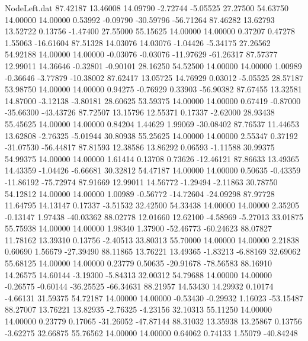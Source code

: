 \begin{filecontents}{NodeLeft.dat}
  87.42187   13.46008   14.09790    -2.72744   -5.05525   27.27500   54.63750   14.00000   14.00000    0.53992   -0.09790  -30.59796  -56.71264
  87.46282   13.62793   13.52722     0.13756   -1.47400   27.55000   55.15625   14.00000   14.00000    0.37207    0.47278    1.55063  -16.61604
  87.51328   14.03076   14.03076    -1.04426   -5.34175   27.26562   54.92188   14.00000   14.00000   -0.03076   -0.03076  -11.97629  -61.26317
  87.57377   12.99011   14.36646    -0.32801   -0.90101   28.16250   54.52500   14.00000   14.00000    1.00989   -0.36646   -3.77879  -10.38002
  87.62417   13.05725   14.76929     0.03012   -5.05525   28.57187   53.98750   14.00000   14.00000    0.94275   -0.76929    0.33903  -56.90382
  87.67455   13.32581   14.87000    -3.12138   -3.80181   28.60625   53.59375   14.00000   14.00000    0.67419   -0.87000  -35.66300  -43.43726
  87.72507   13.15796   12.55371     0.17337   -2.62000   28.93438   55.45625   14.00000   14.00000    0.84204    1.44629    1.99069  -30.08402
  87.76537   11.44653   13.62808    -2.76325   -5.01944   30.80938   55.25625   14.00000   14.00000    2.55347    0.37192  -31.07530  -56.44817
  87.81593   12.38586   13.86292     0.06593   -1.11588   30.99375   54.99375   14.00000   14.00000    1.61414    0.13708    0.73626  -12.46121
  87.86633   13.49365   14.43359    -1.04426   -6.66681   30.32812   54.47187   14.00000   14.00000    0.50635   -0.43359  -11.86192  -75.72974
  87.91669   12.99011   14.56772    -1.29494   -2.11863   30.78750   54.12812   14.00000   14.00000    1.00989   -0.56772  -14.72604  -24.09298
  87.97728   11.64795   14.13147     0.17337   -3.51532   32.42500   54.33438   14.00000   14.00000    2.35205   -0.13147    1.97438  -40.03362
  88.02778   12.01660   12.62100    -4.58969   -5.27013   33.01875   55.75938   14.00000   14.00000    1.98340    1.37900  -52.46773  -60.24623
  88.07827   11.78162   13.39310     0.13756   -2.40513   33.80313   55.70000   14.00000   14.00000    2.21838    0.60690    1.56679  -27.39490
  88.11865   13.76221   13.49365    -1.83213   -6.88169   32.69062   55.68125   14.00000   14.00000    0.23779    0.50635  -20.91678  -78.56583
  88.16910   14.26575   14.60144    -3.19300   -5.84313   32.00312   54.79688   14.00000   14.00000   -0.26575   -0.60144  -36.25525  -66.34631
  88.21957   14.53430   14.29932     0.10174   -4.66131   31.59375   54.72187   14.00000   14.00000   -0.53430   -0.29932    1.16023  -53.15487
  88.27007   13.76221   13.82935    -2.76325   -4.23156   32.10313   55.11250   14.00000   14.00000    0.23779    0.17065  -31.26052  -47.87144
  88.31032   13.35938   13.25867     0.13756   -3.62275   32.66875   55.76562   14.00000   14.00000    0.64062    0.74133    1.55079  -40.84248

\end{filecontents}
